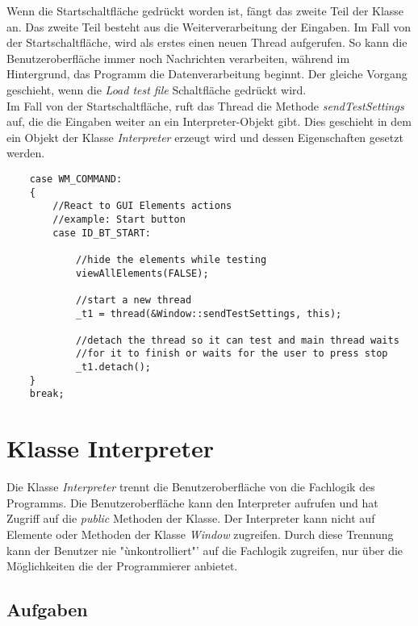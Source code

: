 Wenn die Startschaltfläche gedrückt worden ist, fängt das zweite Teil der Klasse an. Das zweite Teil besteht aus die Weiterverarbeitung der Eingaben. Im Fall von der Startschaltfläche, wird als erstes einen neuen Thread aufgerufen. So kann die Benutzeroberfläche immer noch Nachrichten verarbeiten, während im Hintergrund, das Programm die Datenverarbeitung beginnt. Der gleiche Vorgang geschieht, wenn die \textit{Load test file} Schaltfläche gedrückt wird.\\

Im Fall von der Startschaltfläche, ruft das Thread die Methode \textit{sendTestSettings} auf, die die Eingaben weiter an ein Interpreter-Objekt gibt. Dies geschieht in dem ein Objekt der Klasse \textit{Interpreter} erzeugt wird und dessen Eigenschaften gesetzt werden.

\begin{lstlisting}	 
	case WM_COMMAND:
	{
		//React to GUI Elements actions
		//example: Start button
		case ID_BT_START:

			//hide the elements while testing
			viewAllElements(FALSE);

			//start a new thread
			_t1 = thread(&Window::sendTestSettings, this);

			//detach the thread so it can test and main thread waits
			//for it to finish or waits for the user to press stop
			_t1.detach();
	}
    break;
\end{lstlisting}




\newpage

\section{Klasse Interpreter}

Die Klasse \textit{Interpreter} trennt die Benutzeroberfläche von die Fachlogik des Programms. Die Benutzeroberfläche kann den Interpreter aufrufen und hat Zugriff auf die \textit{public} Methoden der Klasse. Der Interpreter kann nicht auf Elemente oder Methoden der Klasse \textit{Window} zugreifen. Durch diese Trennung kann der Benutzer nie "ùnkontrolliert"' auf die Fachlogik zugreifen, nur über die Möglichkeiten die der Programmierer anbietet.\\

\subsection{Aufgaben}
